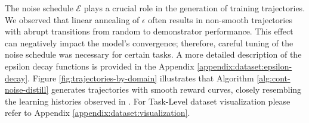 \documentclass{article}
\theoremstyle{plain}
\theoremstyle{definition}
\theoremstyle{remark}
\begin{document}
The noise schedule $\mathcal{E}$ plays a crucial role in the generation of training trajectories. We observed that linear annealing of $\epsilon$ often results in non-smooth trajectories with abrupt transitions from random to demonstrator performance. This effect can negatively impact the model's convergence; therefore, careful tuning of the noise schedule was necessary for certain tasks. A more detailed description of the epsilon decay functions is provided in the Appendix \ref{appendix:dataset:epsilon-decay}. Figure \ref{fig:trajectories-by-domain} illustrates that Algorithm \ref{alg:cont-noise-distill} generates trajectories with smooth reward curves, closely resembling the learning histories observed in  \citet{zisman2024emergenceincontextreinforcementlearning}. For Task-Level dataset visualization please refer to Appendix \ref{appendix:dataset:visualization}.
\end{document}
